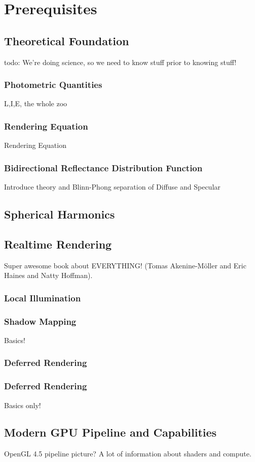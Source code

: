 \documentclass[thesis.tex]{subfiles}
\begin{document}
\chapter{Prerequisites}\label{chap:basics}

\section{Theoretical Foundation}
todo: We're doing science, so we need to know stuff prior to knowing stuff!

\subsection{Photometric Quantities}
L,I,E, the whole zoo

\subsection{Rendering Equation}
Rendering Equation

\subsection{Bidirectional Reflectance Distribution Function}
Introduce theory and Blinn-Phong
separation of Diffuse and Specular

\section{Spherical Harmonics}

\section{Realtime Rendering}
Super awesome book about EVERYTHING! \cite{bib:RealtimeRenderingBook} (Tomas Akenine-M\"{o}ller and Eric Haines and Natty Hoffman).

\subsection{Local Illumination}


\subsection{Shadow Mapping}
Basics!

\subsection{Deferred Rendering}


\subsection{Deferred Rendering}
Basics only!

\section{Modern GPU Pipeline and Capabilities}
OpenGL 4.5 pipeline picture?
A lot of information about shaders and compute.


\subfilebib %
\end{document}
